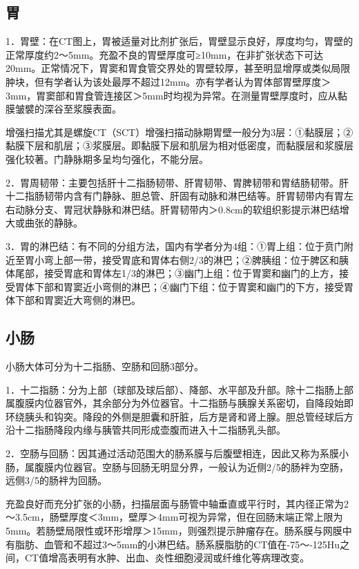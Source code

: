 \subsection{胃}

1．胃壁：在CT图上，胃被适量对比剂扩张后，胃壁显示良好，厚度均匀，胃壁的正常厚度约2～5mm。充盈不良的胃壁厚度可≥10mm，在非扩张状态下可达20mm。正常情况下，胃窦和胃食管交界处的胃壁较厚，甚至明显增厚或类似局限肿块，但有学者认为该处最厚不超过12mm。亦有学者认为胃体部胃壁厚度＞3mm，胃窦部和胃食管连接区＞5mm时均视为异常。在测量胃壁厚度时，应从黏膜皱襞的深谷至浆膜表面。

增强扫描尤其是螺旋CT（SCT）增强扫描动脉期胃壁一般分为3层：①黏膜层；②黏膜下层和肌层；③浆膜层。即黏膜下层和肌层为相对低密度，而黏膜层和浆膜层强化较著。门静脉期多呈均匀强化，不能分层。

2．胃周韧带：主要包括肝十二指肠韧带、肝胃韧带、胃脾韧带和胃结肠韧带。肝十二指肠韧带内含有门静脉、胆总管、肝固有动脉和淋巴结等。肝胃韧带内有胃左右动脉分支、胃冠状静脉和淋巴结。肝胃韧带内＞0.8cm的软组织影提示淋巴结增大或曲张的静脉。

3．胃的淋巴结：有不同的分组方法，国内有学者分为4组：①胃上组：位于贲门附近至胃小弯上部一带，接受胃底和胃体右侧2/3的淋巴；②脾胰组：位于脾区和胰体尾部，接受胃底和胃体左1/3的淋巴；③幽门上组：位于胃窦和幽门的上方，接受胃体下部和胃窦近小弯侧的淋巴；④幽门下组：位于胃窦和幽门的下方，接受胃体下部和胃窦近大弯侧的淋巴。

\subsection{小肠}

小肠大体可分为十二指肠、空肠和回肠3部分。

1．十二指肠：分为上部（球部及球后部）、降部、水平部及升部。除十二指肠上部属腹膜内位器官外，其余部分为外位器官。十二指肠与胰腺关系密切，自降段始即环绕胰头和钩突。降段的外侧是胆囊和肝脏，后方是肾和肾上腺。胆总管经球后方沿十二指肠降段内缘与胰管共同形成壶腹而进入十二指肠乳头部。

2．空肠与回肠：因其通过活动范围大的肠系膜与后腹壁相连，因此又称为系膜小肠，属腹膜内位器官。空肠与回肠无明显分界，一般认为近侧2/5的肠袢为空肠，远侧3/5的肠袢为回肠。

充盈良好而充分扩张的小肠，扫描层面与肠管中轴垂直或平行时，其内径正常为2～3.5cm，肠壁厚度＜3mm，壁厚＞4mm可视为异常，但在回肠末端正常上限为5mm。若肠壁局限性或环形增厚＞15mm，则强烈提示肿瘤存在。肠系膜与网膜中有脂肪、血管和不超过3～5mm的小淋巴结。肠系膜脂肪的CT值在-75～-125Hu之间，CT值增高表明有水肿、出血、炎性细胞浸润或纤维化等病理改变。

